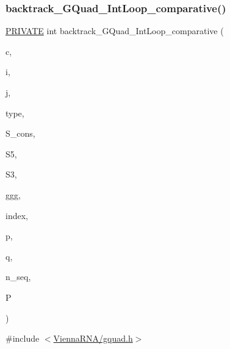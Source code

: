 \subsubsection{\texorpdfstring{backtrack\+\_\+\+G\+Quad\+\_\+\+Int\+Loop\+\_\+comparative()}{backtrack\_GQuad\_IntLoop\_comparative()}}
{\footnotesize\ttfamily \mbox{\hyperlink{group__utils_ga5e151c615eda34903514212f05a5ccf8}{P\+R\+I\+V\+A\+TE}} int backtrack\+\_\+\+G\+Quad\+\_\+\+Int\+Loop\+\_\+comparative (\begin{DoxyParamCaption}\item[{int}]{c,  }\item[{int}]{i,  }\item[{int}]{j,  }\item[{unsigned int $\ast$}]{type,  }\item[{short $\ast$}]{S\+\_\+cons,  }\item[{short $\ast$$\ast$}]{S5,  }\item[{short $\ast$$\ast$}]{S3,  }\item[{int $\ast$}]{ggg,  }\item[{int $\ast$}]{index,  }\item[{int $\ast$}]{p,  }\item[{int $\ast$}]{q,  }\item[{int}]{n\+\_\+seq,  }\item[{\mbox{\hyperlink{group__energy__parameters_ga8a69ca7d787e4fd6079914f5343a1f35}{vrna\+\_\+param\+\_\+t}} $\ast$}]{P }\end{DoxyParamCaption})}



{\ttfamily \#include $<$\mbox{\hyperlink{gquad_8h}{Vienna\+R\+N\+A/gquad.\+h}}$>$}

\mbox{\label{group__gquads_ga7b371308fa5a45c7ac353ef6ed1014de}} 
